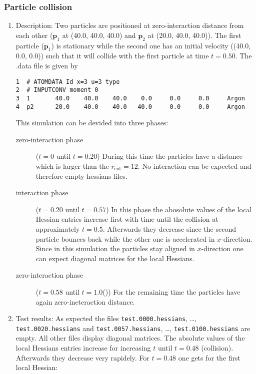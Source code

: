 \documentclass[a4paper]{article}
\newcommand{\boldp}{\boldsymbol{p}}
\begin{document}
\subsubsection{Particle collision}
\label{sec-1-4-6}
\begin{enumerate}
\item Description:
\label{sec-1-4-6-1}
Two particles are positioned at zero-interaction distance from each other (\(\boldp_1\) at (40.0, 40.0, 40.0) and \(\boldp_2\) at (20.0, 40.0, 40.0)).
The first particle (\(\boldp_1\)) is stationary while the second one has an initial velocity ((40.0, 0.0, 0.0)) such that it will collide
with the first particle at time \(t=0.50\).
The .data file is given by
\begin{verbatim}
1  # ATOMDATA Id x=3 u=3 type
2  # INPUTCONV moment 0
3  1       40.0    40.0    40.0    0.0     0.0     0.0     Argon
4  p2      20.0    40.0    40.0   40.0     0.0     0.0     Argon
\end{verbatim}
This simulation can be devided into three phases:
\begin{description}
\item[{zero-interaction phase}] (\(t = 0\) until \(t = 0.20\)) During this time the particles have a distance which is larger than the \(r_{\textrm{cut}} = 12\).
No interaction can be expected and therefore empty hessians-files.
\item[{interaction phase}] (\(t = 0.20\) until \(t = 0.57\)) In this phase the abosolute values of the local Hessian entries increase first with time until the collision at approximately \(t = 0.5\).
Afterwards they decrease since the second particle bounces back while the other one is accelerated in \(x\)-direction.
Since in this simulation the particles stay aligned in \(x\)-direction one can expect diagonal matrices for the local Hessians.
\item[{zero-interaction phase}] (\(t = 0.58\) until \(t = 1.0\)()) For the remaining time the particles have again zero-ineteraction distance.
\end{description}
\item Test results:
\label{sec-1-4-6-2}
As expected the files \texttt{test.0000.hessians}, \ldots{}, \texttt{test.0020.hessians} and \texttt{test.0057.hessians}, \ldots{}, \texttt{test.0100.hessians} are empty.
All other files display diagonal matrices. The absolute values of the local Hessians entries increase for increasing \(t\) until \(t = 0.48\) (collision). Afterwards they decrease very rapidely.
For \(t = 0.48\) one gets for the first local Hessian:

\end{enumerate}
\end{document}
